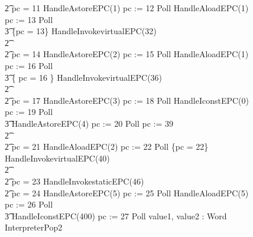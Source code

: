 \begin{figure}[t!]
{\begin{circus}
    \t2 {} \circelse pc = 11 \circthen HandleAstoreEPC(1) \circseq pc := 12 \circseq Poll \circseq HandleAloadEPC(1) \circseq pc := 13 \circseq Poll \circseq \\
    \t3 \{pc = 13\} \circseq HandleInvokevirtualEPC(32) \\
    \t2 {} \cdots {} \\
    \t2 {} \circelse pc = 14 \circthen HandleAstoreEPC(2) \circseq pc := 15 \circseq Poll \circseq HandleAloadEPC(1) \circseq pc := 16 \circseq Poll \circseq \\
    \t3 \{ pc = 16 \} \circseq HandleInvokevirtualEPC(36) \\
    \t2 {} \cdots {} \\
    \t2 {} \circelse pc = 17 \circthen HandleAstoreEPC(3) \circseq pc := 18 \circseq Poll \circseq HandleIconstEPC(0) \circseq pc := 19 \circseq Poll \circseq \\
    \t3 HandleAstoreEPC(4) \circseq pc := 20 \circseq Poll \circseq pc := 39 \\
    \t2 {} \cdots {} \\
    \t2 {} \circelse pc = 21 \circthen HandleAloadEPC(2) \circseq pc := 22 \circseq Poll \circseq \{pc = 22\} \circseq HandleInvokevirtualEPC(40) \\
    \t2 {} \cdots {} \\
    \t2 {} \circelse pc = 23 \circthen HandleInvokestaticEPC(46) \\
    \t2 {} \circelse pc = 24 \circthen HandleAstoreEPC(5) \circseq pc := 25 \circseq Poll \circseq HandleAloadEPC(5) \circseq pc := 26 \circseq Poll \circseq \\
    \t3 HandleIconstEPC(400) \circseq pc := 27 \circseq Poll \circseq \circvar value1, value2 : Word \circspot InterpreterPop2 \circseq \\

\end{circus}}
\end{figure}
